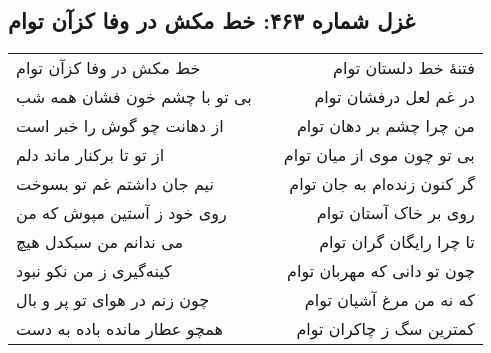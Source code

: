 \begin{center}
\section*{غزل شماره ۴۶۳: خط مکش در وفا کزآن توام}
\label{sec:463}
\begin{longtable}{l p{0.5cm} r}
خط مکش در وفا کزآن توام
&&
فتنهٔ خط دلستان توام
\\
بی تو با چشم خون فشان همه شب
&&
در غم لعل درفشان توام
\\
از دهانت چو گوش را خبر است
&&
من چرا چشم بر دهان توام
\\
از تو تا برکنار ماند دلم
&&
بی تو چون موی از میان توام
\\
نیم جان داشتم غم تو بسوخت
&&
گر کنون زنده‌ام به جان توام
\\
روی خود ز آستین مپوش که من
&&
روی بر خاک آستان توام
\\
می ندانم من سبکدل هیچ
&&
تا چرا رایگان گران توام
\\
کینه‌گیری ز من نکو نبود
&&
چون تو دانی که مهربان توام
\\
چون زنم در هوای تو پر و بال
&&
که نه من مرغ آشیان توام
\\
همچو عطار مانده باده به دست
&&
کمترین سگ ز چاکران توام
\\
\end{longtable}
\end{center}
